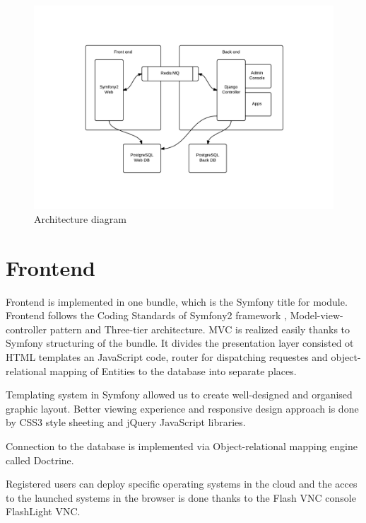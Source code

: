 \documentclass[thesis=B,english]{FITthesis}[2013/04/26]
\begin{document}
\begin{figure}[h!]
	\includegraphics[trim=3.2cm 2cm 3cm 2.5cm, clip=true, totalheight=260pt]{images/tndw-arch.pdf}
	\caption{Architecture diagram}
	\label{fig: tndw-arch}
\end{figure}


\section{Frontend}

Frontend is implemented in one bundle, which is the Symfony title for module. Frontend follows the Coding Standards of Symfony2 framework \cite{symfony_conventions}, Model-view-controller pattern and Three-tier architecture. MVC is realized easily thanks to Symfony structuring of the bundle. It divides the presentation layer consisted ot HTML templates an JavaScript code, router for dispatching requestes and object-relational mapping of Entities to the database into separate places.

Templating system in Symfony allowed us to create well-designed and organised graphic layout. Better viewing experience and responsive design approach is done by CSS3 style sheeting and jQuery JavaScript libraries.

Connection to the database is implemented via Object-relational mapping engine called Doctrine.

Registered users can deploy specific operating systems in the cloud and the acces to the launched systems in the browser is done thanks to the Flash VNC console FlashLight VNC.
\end{document}
